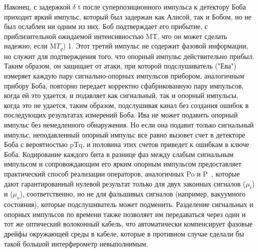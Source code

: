 Наконец, с задержкой $\delta$ t после суперпозиционного импульса к детектору Боба приходит яркий импульс, который был задержан как Алисой, так и Бобом, но не был ослаблен ни одним из них. Боб подтверждает его прибытие, с приблизительной ожидаемой интенсивностью MT, что он может сделать надежно, если M$T_q$) 1. Этот третий импульс не содержит фазовой информации, но служит для подтверждения того, что опорный импульс действительно прибыл. Таким образом, он защищает от атаки, при которой подслушиватель ("Ева") измеряет каждую пару сигнально-опорных импульсов прибором, аналогичным прибору Боба, повторно передает корректно сфабрикованную пару импульсов, когда ей это удается, и подавляет как сигнальный, так и опорный импульсы, когда это не удается, таким образом, подслушивая канал без создания ошибок в последующих результатах измерений Боба. Ива не может подавить опорный импульс без немедленного обнаружения. Но если она подавит только сигнальный импульс, неподавленный опорный импульс все равно вызовет счет в детекторе Боба с вероятностью pTq, и половина этих счетов приведет к ошибкам в ключе Боба.
Кодирование каждого бита в разнице фаз между слабым сигнальным импульсом и сопровождающим его ярким опорным импульсом предоставляет практический способ реализации операторов, аналогичных Po и P~, которые дают гарантированный нулевой результат только для двух законных сигналов ($\mu_i$) и ($\mu_o$), соответственно, но не для фальшивых сигналов (например, вакуумного состояния), которые подслушиватель может подменить. Разделение сигнальных и опорных импульсов по времени также позволяет им передаваться через один и тот же оптический волоконный кабель, что автоматически компенсирует фазовые дрейфы окружающей среды в кабеле, которые в противном случае сделали бы такой большой интерферометр невыполнимым.

